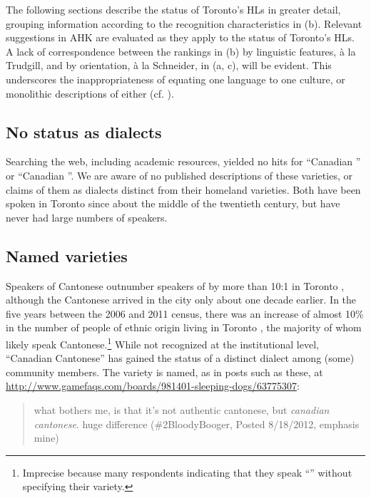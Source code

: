 \documentclass[output=paper]{LSP/langsci}
\begin{document}
The following sections describe the status of Toronto’s HLs in greater detail, grouping information according to the recognition characteristics in  (b). Relevant suggestions in AHK are evaluated as they apply to the status of Toronto’s HLs. A lack of correspondence between the rankings in  (b) by linguistic features, à la Trudgill, and by orientation, à la Schneider, in  (a, c), will be evident. This underscores the inappropriateness of equating one language to one culture, or monolithic descriptions of either (cf. \citealt{foley_personhood_2005}). 

\subsection{No status as dialects}

Searching the web, including academic resources, yielded no hits for “Canadian ” or “Canadian ”. We are aware of no published descriptions of these varieties, or claims of them as dialects distinct from their homeland varieties. Both have been spoken in Toronto since about the middle of the twentieth century, but have never had large numbers of speakers.

\subsection{Named varieties}

Speakers of Cantonese outnumber speakers of  by more than 10:1 in Toronto \citep{statistics_canada_census_2011}, although the Cantonese arrived in the city only about one decade earlier. In the five years between the 2006 and 2011 census, there was an increase of almost 10\% in the number of people of  ethnic origin living in Toronto \citep{statistics_canada_2011_2011}, the majority of whom likely speak Cantonese.\footnote{ Imprecise because many respondents indicating that they speak “” without specifying their variety. } While not recognized at the institutional level, “Canadian Cantonese” has gained the status of a distinct dialect among (some) community members. The variety is named, as in posts such as these, at \url{http://www.gamefaqs.com/boards/981401-sleeping-dogs/63775307}:

\begin{quote}
what bothers me, is that it’s not authentic cantonese, but \textit{canadian cantonese}. huge difference (\#2BloodyBooger, Posted 8/18/2012, emphasis mine)
\end{quote}
\end{document}
